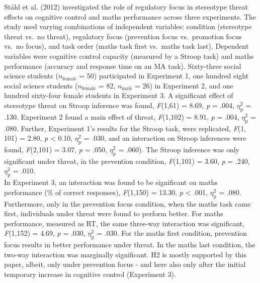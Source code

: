 \documentclass[
  stu, a4paper, 12pt,mask,floatsintext]{apa7}
\begin{document}
Ståhl et al. (2012) investigated the role of regulatory focus in stereotype threat effects on cognitive control and maths performance across three experiments.
The study used varying combinations of independent variables: condition (stereotype threat vs.~no threat), regulatory focus (prevention focus vs.~promotion focus vs.~no focus), and task order (maths task first vs.~maths task last).
Dependent variables were cognitive control capacity (measured by a Stroop task) and maths performance (accuracy and response time on an MA task).
Sixty-three social science students (\(n_{\text{female}}\) = 50) participated in Experiment 1, one hundred eight social science students (\(n_{\text{female}}\) = 82, \(n_{\text{male}}\) = 26) in Experiment 2, and one hundred sixty-four female students in Experiment 3.
A significant effect of stereotype threat on Stroop inference was found, \emph{F}(1,61) = 8.69, \emph{p} = .004, \(\eta^{2}_{\text{p}}\) = .130.
Experiment 2 found a main effect of threat, \emph{F}(1,102) = 8.91, \emph{p} = .004, \(\eta^{2}_{\text{p}}\) = .080.
Further, Experiment 1's results for the Stroop task, were replicated, \emph{F}(1, 101) = 2.80, \emph{p} \textless{} 0.10, \(\eta^{2}_{\text{p}}\) = .030, and an interaction on Stroop inferences were found, \emph{F}(2,101) = 3.07, \emph{p} = .050, \(\eta^{2}_{\text{p}}\) = .060).
The Stroop inference was only significant under threat, in the prevention condition, \emph{F}(1,101) = 3.60, \emph{p} = .240, \(\eta^{2}_{\text{p}}\) = .010.\\
In Experiment 3, an interaction was found to be significant on maths performance (\% of correct responses), \emph{F}(1,150) = 13.30, \emph{p} \textless{} .001, \(\eta^{2}_{\text{p}}\) = .080.
Furthermore, only in the prevention focus condition, when the maths task came first, individuals under threat were found to perform better.
For maths performance, measured as RT, the same three-way interaction was significant, \emph{F}(1,152) = 4.69, \emph{p} = .030, \(\eta^{2}_{\text{p}}\) = .030.
For the maths first condition, prevention focus results in better performance under threat.
In the maths last condition, the two-way interaction was marginally significant.
H2 is mostly supported by this paper, albeit, only under prevention focus - and here also only after the initial temporary increase in cognitive control (Experiment 3).
\end{document}
